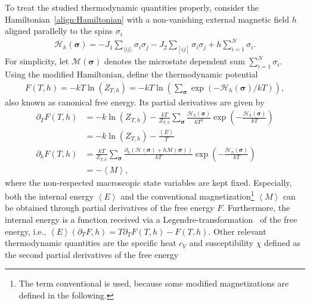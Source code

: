 To treat the studied thermodynamic quantities properly, consider the Hamiltonian~\eqref{align:Hamiltonian} with a non-vanishing external magnetic 
field $h$ aligned parallelly to the spins $\sigma_i$
\begin{align*}
    \mathcal{H}_h(\bm{\sigma})=-J_1\sum_{\langle ij \rangle}\sigma_i\sigma_j-J_2\sum_{[ij]}\sigma_i\sigma_j+h\sum_{i=1}^N\sigma_i.
\end{align*}
For simplicity, let $\mathcal{M}(\bm{\sigma})$ denotes the microstate dependent sum $\sum_{i=1}^N\sigma_i$. Using the modified Hamiltonian, define 
the thermodynamic potential
\begin{align}
    F(T,h)=-kT\ln\left(Z_{T,h}\right)=-kT\ln\left(\sum_{\bm{\sigma}}\exp(-\mathcal{H}_h(\bm{\sigma})/kT)\right),
    \label{align:FreeEnergy}
\end{align}
also known as canonical free energy. Its partial derivatives are given by
\begin{align}
    \partial_TF(T,h) &= -k\ln\left(Z_{T,h}\right)-\frac{kT}{Z_{T,h}} \sum_{\bm{\sigma}}\frac{\mathcal{H}_h(\bm{\sigma})}{kT^2}\exp\left(-\frac{\mathcal{H}_h(\bm{\sigma})}{kT}\right) \nonumber \\
                     &= -k\ln\left(Z_{T,h}\right)-\frac{\left\langle E \right\rangle}{T} \label{align:ener} \\
    \partial_hF(T,h) &= \frac{kT}{Z_{T,h}}\sum_{\bm{\sigma}}\frac{\partial_h\left(\mathcal{H}(\bm{\sigma})+h\mathcal{M}(\bm{\sigma})\right)}{kT}\exp\left(-\frac{\mathcal{H}_h(\bm{\sigma})}{kT}\right) \nonumber \\
                     &= -\left\langle M \right\rangle, \label{align:magn}
\end{align}
where the non-respected macroscopic state variables are kept fixed. Especially, both the internal energy $\left\langle E \right\rangle$ 
and the conventional magnetization\footnote{The term conventional is used, because some modified magnetizations are defined in the following.} 
$\left\langle M \right\rangle$ can be obtained through partial derivatives of the free energy $F$. 
Furthermore, the internal energy is a function received via a Legendre-transformation~\cite[p.79]{Schwabl2000} of the free energy, i.e., 
$\left\langle E \right\rangle\!(\partial_TF,h)=T\partial_TF(T,h)\!-\!F(T,h)$. Other relevant thermodynamic quantities are the specific heat $c_V$ and
susceptibility $\chi$ defined as the second partial derivatives of the free energy 
